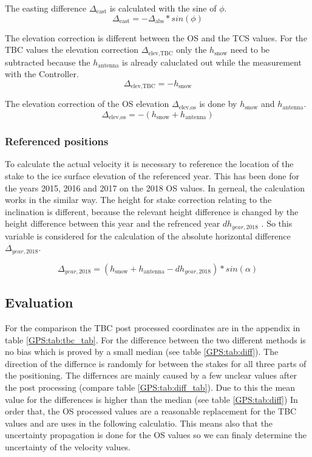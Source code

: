 The easting difference $\Delta_{\text{east}}$ is calculated with the sine of $\phi$.
\begin{equation}
	\Delta_{\text{east}} = - \Delta_{\text{abs}} * sin(\phi)
\end{equation}

The elevation correction is different between the OS and the TCS values.
For the TBC values the elevation correction $\Delta_{\text{elev,TBC}}$ only the $h_{\text{snow}}$ need to be subtracted because the $h_{\text{antenna}}$ is already caluclated out while the measurement with the Controller.
\begin{equation}
	\Delta_{\text{elev,TBC}} = - h_{\text{snow}} 
\end{equation}

The elevation correction of the OS elevation $\Delta_{\text{elev,os}}$ is done by $h_{\text{snow}}$ and $h_{\text{antenna}}$.
\begin{equation}
	\Delta_{\text{elev,os}} = - (h_{\text{snow}} + h_{\text{antenna}}) 
\end{equation}

\subsubsection*{Referenced positions}

To calculate the actual velocity it is necessary to reference the location of the stake to the ice surface elevation of the referenced year. 
This has been done for the years 2015, 2016 and 2017 on the 2018 OS values.
In gerneal, the calculation works in the similar way.
The height for stake correction relating to the inclination is different, because the relevant height difference is changed by the height difference between this year and the refrenced year $dh_{year,2018}$ . So this variable is considered for the calculation of the absolute horizontal difference $\Delta_{year,2018}$.

\begin{equation}
	\Delta_{year,2018} = (h_{\text{snow}} + h_{\text{antenna}} - dh_{year,2018}) * sin(\alpha)
\end{equation}

\subsection{Evaluation}
For the comparison the TBC post processed coordinates are in the appendix in table \ref{GPS:tab:tbc_tab}.
For the difference between the two different methods is no bias which is proved by a small median (see table \ref{GPS:tab:diff}).
The direction of the differnce is randomly for between the stakes for all three parts of the positioning.
The differnces are mainly caused by a few unclear values after the post processing (compare table \ref{GPS:tab:diff_tab}).
Due to this the mean value for the differences is higher than the median (see table \ref{GPS:tab:diff}) 
In order that, the OS processed values are a reasonable replacement for the TBC values and are uses in the following calculatio.
This means also that the uncertainty propagation is done for the OS values so we can finaly determine the uncertainty of the velocity values.

